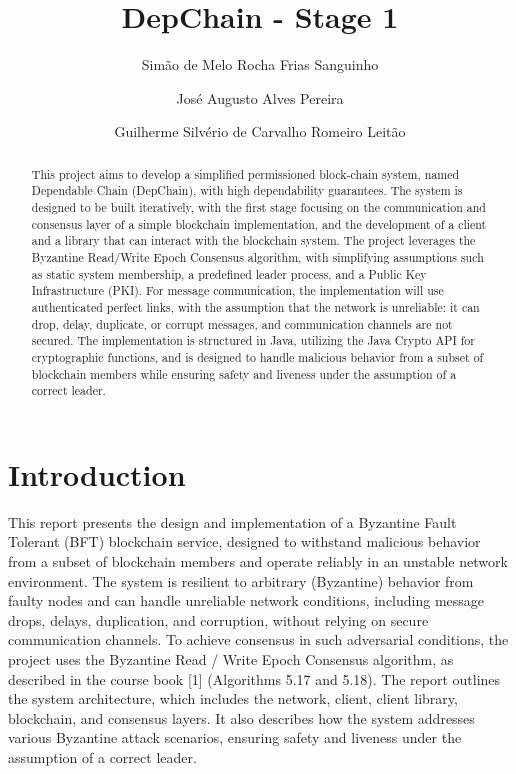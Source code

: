 \documentclass[runningheads]{llncs}
\begin{document}
%
\title{DepChain - Stage 1}
%
%
\author{Simão de Melo Rocha Frias Sanguinho \and José
Augusto Alves Pereira \and Guilherme Silvério de
Carvalho Romeiro Leitão}
%
%
%
\maketitle              %
%
\begin{abstract}
This project aims to develop a simplified permissioned block-chain system, named
Dependable Chain (DepChain), with high dependability guarantees. The system is
designed to be built iteratively, with the first stage focusing on the
communication and consensus layer of a simple blockchain implementation, and the
development of a client and a library that can interact with the blockchain
system. The project leverages the Byzantine Read/Write Epoch Consensus
algorithm, with simplifying assumptions such as static system membership, a
predefined leader process, and a Public Key Infrastructure (PKI). For message
communication, the implementation will use authenticated perfect links, with the
assumption that the  network  is  unreliable:  it  can  drop,  delay, duplicate,
or  corrupt messages, and communication channels are not secured. The
implementation is structured in Java, utilizing the Java Crypto API for
cryptographic functions, and is designed to handle malicious behavior from a
subset of blockchain members while ensuring safety and liveness under the
assumption of a correct leader.
%
\end{abstract}
%
\section{Introduction}
This report presents the design and implementation of a Byzantine Fault Tolerant
(BFT) blockchain service, designed to withstand malicious behavior from a subset
of blockchain members and operate reliably in an unstable network environment.
The system is resilient to arbitrary (Byzantine) behavior from faulty nodes and
can handle unreliable network conditions, including message drops, delays,
duplication, and corruption, without relying on secure communication channels.
To achieve consensus in such adversarial conditions, the project uses the
Byzantine Read / Write Epoch Consensus algorithm, as described in the course
book [1] (Algorithms 5.17 and 5.18). The report outlines the system
architecture, which includes the network, client, client library, blockchain, and
consensus layers. It also describes how the system addresses various Byzantine
attack scenarios, ensuring safety and liveness under the assumption of a correct
leader.
%
\end{document}
